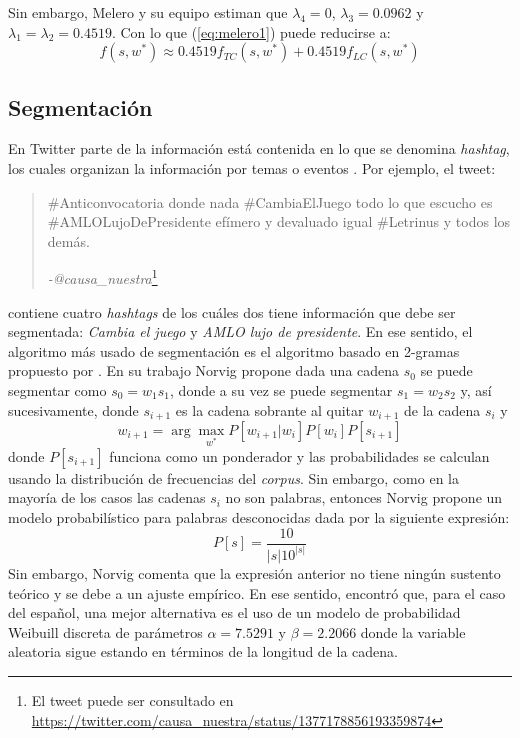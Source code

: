 Sin embargo, Melero y su equipo estiman que $\lambda_4 = 0$, $\lambda_3 = 0.0962$ y $\lambda_1=\lambda_2 = 0.4519$. Con lo que (\ref{eq:melero1}) puede reducirse a:
\begin{equation}
	\label{eq:melero2}
	f(s,w^{*}) \approx 0.4519f_{TC}(s,w^{*}) + 0.4519f_{LC}(s,w^{*}) 
\end{equation}

\subsection{Segmentación}

En Twitter parte de la información está contenida en lo que se denomina \textit{hashtag}, los cuales organizan la información por temas o eventos \citep{small2011hashtag}. Por ejemplo, el tweet:

\begin{quotation}
	\#Anticonvocatoria donde nada \#CambiaElJuego todo lo que escucho es \#AMLOLujoDePresidente efímero y devaluado igual \#Letrinus y todos los demás.\\ \begin{flushright}
		\textit{-@causa\_nuestra}\footnote{El tweet puede ser consultado en \url{https://twitter.com/causa_nuestra/status/1377178856193359874}}
	\end{flushright}
\end{quotation}
contiene cuatro \textit{hashtags} de los cuáles dos tiene información que debe ser segmentada: \textit{Cambia el juego} y \textit{AMLO lujo de presidente}. En ese sentido, el algoritmo más usado de segmentación es el algoritmo basado en 2-gramas propuesto por \cite{norvig209natural}. En su trabajo Norvig propone dada una cadena $s_0$ se puede segmentar como $s_0 = w_1s_1$, donde a su vez se puede segmentar $s_1 = w_2s_2$ y, así sucesivamente, donde $s_{i+1}$ es la cadena sobrante al quitar $w_{i+1}$ de la cadena $s_{i}$ y
\begin{equation}
	\label{eq:norvig}
	w_{i+1} = \arg\max_{w^{*}} P\left[w_{i+1} \vert w_{i}\right]P\left[w_{i}\right]P[s_{i+1}]
\end{equation}
donde $P[s_{i+1}]$ funciona como un ponderador y las probabilidades se calculan usando la distribución de frecuencias del \textit{corpus}. Sin embargo, como en la mayoría de los casos las cadenas $s_i$ no son palabras, entonces Norvig propone un modelo probabilístico para palabras desconocidas dada por la siguiente expresión:
\begin{equation}
	\label{eq:norvigunknown}
	P[s] = \frac{10}{\vert s \vert 10^{\vert s \vert}}
\end{equation}
Sin embargo, Norvig comenta que la expresión anterior no tiene ningún sustento teórico y se debe a un ajuste empírico. En ese sentido, \cite{cano2019segmentacion} encontró que, para el caso del español, una mejor alternativa es el uso de un modelo de probabilidad Weibuill discreta de parámetros $\alpha = 7.5291$ y $\beta = 2.2066$ donde la variable aleatoria sigue estando en términos de la longitud de la cadena.

